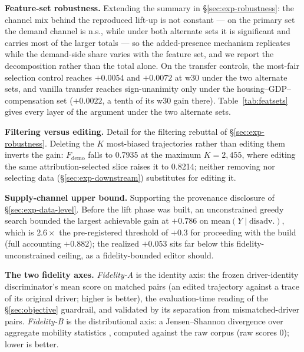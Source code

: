 \textbf{Feature-set robustness.} Extending the summary in
\S\ref{sec:exp-robustness}: the channel mix behind the reproduced lift-up is
not constant --- on the primary set the demand channel is n.s., while under
both alternate sets it is significant and carries most of the larger totals ---
so the added-presence mechanism replicates while the demand-side share varies
with the feature set, and we report the decomposition rather than the total
alone. On the transfer controls, the most-fair selection control reaches
$+0.0054$ and $+0.0072$ at w30 under the two alternate sets, and vanilla
transfer reaches sign-unanimity only under the housing--GDP--compensation set
($+0.0022$, a tenth of its w30 gain there).
Table~\ref{tab:featsets} gives every layer of the argument under the two
alternate sets.


\textbf{Filtering versus editing.} Detail for the filtering rebuttal of
\S\ref{sec:exp-robustness}. Deleting the $K$ most-biased trajectories rather
than editing them inverts the gain: $F_{\mathrm{demo}}$ falls to 0.7935 at the
maximum $K = 2{,}455$, where editing the same attribution-selected slice
raises it to 0.8214; neither removing nor selecting data
(\S\ref{sec:exp-downstream}) substitutes for editing it.

\textbf{Supply-channel upper bound.} Supporting the provenance disclosure of
\S\ref{sec:exp-data-level}. Before the lift phase was built, an unconstrained
greedy search bounded the largest achievable gain at $+0.786$ on
$\mathrm{mean}(Y \mid \mathrm{disadv.})$, which is $2.6\times$ the
pre-registered threshold of $+0.3$ for proceeding with the build (full
accounting $+0.882$); the realized $+0.053$ sits far below this
fidelity-unconstrained ceiling, as a fidelity-bounded editor should.

\textbf{The two fidelity axes.} \emph{Fidelity-A} is the identity axis: the
frozen driver-identity discriminator's mean score on matched pairs (an
edited trajectory against a trace of its original driver; higher is
better), the evaluation-time reading of the \S\ref{sec:objective}
guardrail, and validated by its separation from mismatched-driver pairs.
\emph{Fidelity-B} is the distributional axis: a Jensen--Shannon divergence
over aggregate mobility statistics \cite{feng2020simulate}, computed against
the raw corpus (raw scores 0); lower is better.

